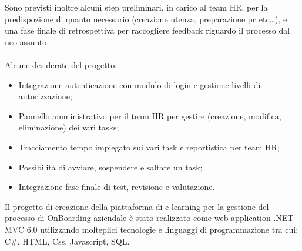 Sono previsti inoltre alcuni step preliminari, in carico al team HR, per la predispozione di quanto 
necessario (creazione utenza, preparazione pc etc\dots), e una fase finale di 
retrospettiva per raccogliere feedback riguardo il processo dal neo assunto.\ 
\\ \\
Alcune desiderate del progetto:
\begin{itemize}
    \item Integrazione autenticazione con modulo di login e gestione livelli di autorizzazione;
    \item Pannello amministrativo per il team HR per gestire (creazione, modifica, eliminazione) dei vari tasks;
    \item Tracciamento tempo impiegato sui vari task e reportistica per team HR;\
    \item Possibilità di avviare, sospendere e saltare un task;
    \item Integrazione fase finale di test, revisione e valutazione.
\end{itemize}
Il progetto di creazione della piattaforma di e-learning per la gestione del processo di
OnBoarding aziendale è stato realizzato come web application .NET MVC 6.0
utilizzando molteplici tecnologie e linguaggi di programmazione tra cui: C\#, HTML, 
Css, Javascript, SQL.
